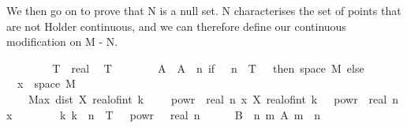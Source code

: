 \begin{isabellebody}
\begin{isamarkuptext}
  We then go on to prove that N is a null set. N characterises the set of points that are
  not Holder continuous, and we can therefore define our continuous modification on M - N.%
\end{isamarkuptext}\isamarkuptrue%
\ \ \isacommand{{\isacharbraceleft}{\kern0pt}}\isamarkupfalse%
\isanewline
\ \ \ \ \isamarkupfalse%
\ T\ {\isacharcolon}{\kern0pt}{\isacharcolon}{\kern0pt}\ real\ \isamarkupfalse%
\ {\isachardoublequoteopen}T\ {\isachargreater}{\kern0pt}\ {}{\isachardoublequoteclose}\isanewline
\ \ \ \ \isamarkupfalse%
\ A\ \ {\isachardoublequoteopen}A\ {\isasymequiv}\ {\isasymlambda}n{\isachardot}{\kern0pt}\ if\ {}\ {\isacharcircum}{\kern0pt}\ n\ {\isacharasterisk}{\kern0pt}\ T\ {\isacharless}{\kern0pt}\ {}\ then\ space\ {\isacharquery}{\kern0pt}M\ else\ \isanewline
\ \ {\isacharbraceleft}{\kern0pt}x\ {\isasymin}\ space\ {\isacharquery}{\kern0pt}M{\isachardot}{\kern0pt}\ \isanewline
\ \ \ \ Max\ {\isacharbraceleft}{\kern0pt}dist\ {\isacharparenleft}{\kern0pt}X\ {\isacharparenleft}{\kern0pt}real{\isacharunderscore}{\kern0pt}of{\isacharunderscore}{\kern0pt}int\ {\isacharparenleft}{\kern0pt}k\ {\isacharminus}{\kern0pt}\ {}{\isacharparenright}{\kern0pt}\ {\isacharasterisk}{\kern0pt}\ {}\ powr\ {\isacharminus}{\kern0pt}\ real\ n{\isacharparenright}{\kern0pt}\ x{\isacharparenright}{\kern0pt}\ {\isacharparenleft}{\kern0pt}X\ {\isacharparenleft}{\kern0pt}real{\isacharunderscore}{\kern0pt}of{\isacharunderscore}{\kern0pt}int\ k\ {\isacharasterisk}{\kern0pt}\ {}\ powr\ {\isacharminus}{\kern0pt}\ real\ n{\isacharparenright}{\kern0pt}\ x{\isacharparenright}{\kern0pt}\isanewline
\ \ \ \ \ \ \ {\isacharbar}{\kern0pt}\ k{\isachardot}{\kern0pt}\ k\ {\isasymin}\ {\isacharbraceleft}{\kern0pt}{}{\isachardot}{\kern0pt}{\isachardot}{\kern0pt}{\isasymlfloor}{}{\isacharcircum}{\kern0pt}n\ {\isacharasterisk}{\kern0pt}\ T{\isasymrfloor}{\isacharbraceright}{\kern0pt}{\isacharbraceright}{\kern0pt}\ {\isasymge}\ {}\ powr\ {\isacharparenleft}{\kern0pt}{\isacharminus}{\kern0pt}{\isasymgamma}\ {\isacharasterisk}{\kern0pt}\ real\ n{\isacharparenright}{\kern0pt}{\isacharbraceright}{\kern0pt}{\isachardoublequoteclose}\isanewline
\ \ \ \ \isamarkupfalse%
\ {\isacharquery}{\kern0pt}B\ {\isacharequal}{\kern0pt}\ {\isachardoublequoteopen}{\isasymlambda}n{\isachardot}{\kern0pt}\ {\isacharparenleft}{\kern0pt}{\isasymUnion}m{\isachardot}{\kern0pt}\ A\ {\isacharparenleft}{\kern0pt}m\ {\isacharplus}{\kern0pt}\ n{\isacharparenright}{\kern0pt}{\isacharparenright}{\kern0pt}{\isachardoublequoteclose}\isanewline

\end{isabellebody}

